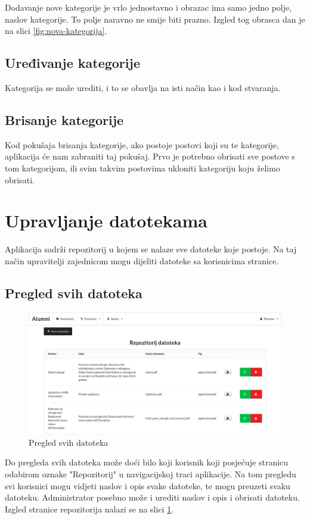 \documentclass[zavrsni, numeric]{fer}
\begin{document}
Dodavanje nove kategorije je vrlo jednostavno i obrazac ima samo jedno polje, naslov kategorije. To polje naravno ne smije biti prazno. Izgled tog obrasca dan je na slici \ref{fig:nova-kategorija}.

\subsection{Uređivanje kategorije}
Kategorija se može urediti, i to se obavlja na isti način kao i kod stvaranja.

\subsection{Brisanje kategorije}
Kod pokušaja brisanja kategorije, ako postoje postovi koji su te kategorije, aplikacija će nam zabraniti taj pokušaj. Prvo je potrebno obrisati sve postove s tom kategorijom, ili svim takvim postovima ukloniti kategoriju koju želimo obrisati.

\section{Upravljanje datotekama}
Aplikacija sadrži repozitorij u kojem se nalaze sve datoteke koje postoje. Na taj način upravitelji zajednicom mogu dijeliti datoteke sa korisnicima stranice.

\subsection{Pregled svih datoteka}

\begin{figure}[H]
	\centering
	\includegraphics[width=13cm]{slike/repozitorij.png}
	\caption{Pregled svih datoteka}
	\label{fig:repozitorij}
\end{figure}

Do pregleda svih datoteka može doći bilo koji korisnik koji posjećuje stranicu odabirom oznake "Repozitorij" u navigacijskoj traci aplikacije. Na tom pregledu svi korisnici mogu vidjeti naslov i opis svake datoteke, te mogu preuzeti svaku datoteku. Administrator posebno može i urediti naslov i opis i obrisati datoteku. Izgled stranice repozitorija nalazi se na slici \ref{fig:repozitorij}.
\end{document}

